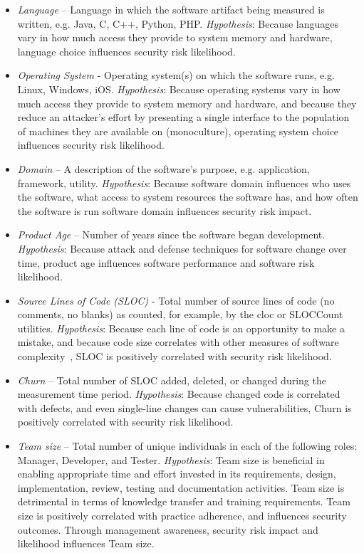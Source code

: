 \begin{itemize}
\item \textit{Language} – Language in which the software artifact being measured is written, e.g. Java, C, C++, Python, PHP. \textit{Hypothesis}: Because languages vary in how much access they provide to system memory and hardware, language choice influences security risk likelihood.
\item \textit{Operating System} - Operating system(s) on which the software runs, e.g. Linux, Windows, iOS. \textit{Hypothesis}: Because operating systems vary in how much access they provide to system memory and hardware, and because they reduce an attacker’s effort by presenting a single interface to the population of machines they are available on (monoculture), operating system choice influences security risk likelihood.
\item \textit{Domain} – A description of the software’s purpose, e.g. application, framework, utility. 
\textit{Hypothesis}: Because software domain influences who uses the software, what access to system resources the software has, and how often the software is run software domain influences security risk impact.
\item \textit{Product Age} – Number of years since the software began development. 
\textit{Hypothesis}: Because attack and defense techniques for software change over time, product age influences software performance and software risk likelihood.
\item \textit{Source Lines of Code (SLOC)} - Total number of source lines of code (no comments, no blanks) as counted, for example, by the cloc or SLOCCount utilities. 
\textit{Hypothesis}: Because each line of code is an opportunity to make a mistake,  and because code size correlates with other measures of software complexity~\cite{herraiz2009statistical},  SLOC is positively correlated with security risk likelihood.
\item \textit{Churn} – Total number of SLOC added, deleted, or changed during the measurement time period. 
\textit{Hypothesis}: Because changed code is correlated with defects, and even single-line changes   can cause vulnerabilities, Churn is positively correlated with security risk likelihood.
\item \textit{Team size} – Total number of unique individuals in each of the following roles: Manager, Developer, and Tester. \textit{Hypothesis}: Team size is beneficial in enabling appropriate time and effort invested in its requirements, design, implementation, review, testing and documentation activities. Team size is detrimental in terms of knowledge transfer and training requirements. Team size is positively correlated with practice adherence, and influences security outcomes. Through management awareness, security risk impact and likelihood influences Team size.

\end{itemize}
